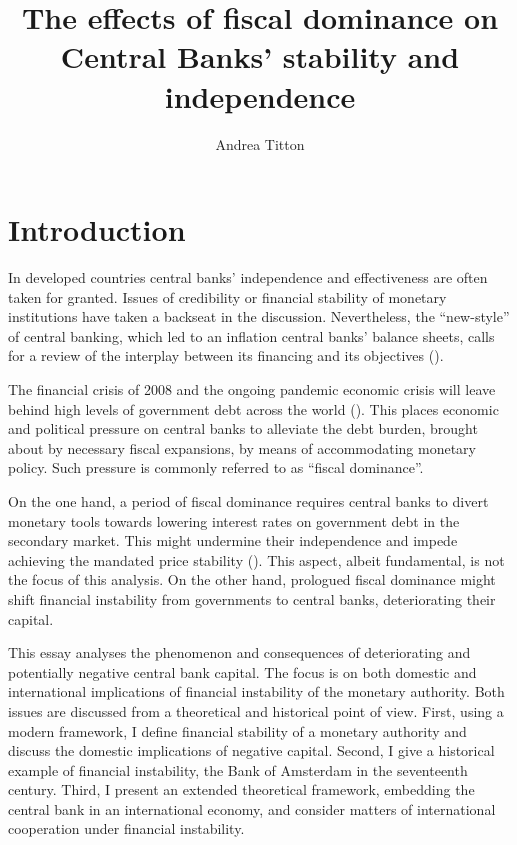 \documentclass[american]{scrartcl}
\title{The effects of fiscal dominance on Central Banks' stability and independence}
\author{Andrea Titton}
\newcommand{\comment}[1]{\iffalse#1\fi}
\begin{document}
\clearpage
\thispagestyle{empty}
\maketitle
\clearpage


\comment{
TODO: History | Theory of CB dividends | Financial stability under deferred assets |
Expectations of Inflation | Effects on global banks
}


\section{Introduction}

In developed countries central banks' independence and effectiveness are often taken for granted. Issues of credibility or financial stability of monetary institutions have taken a backseat in the discussion. Nevertheless, the ``new-style'' of central banking, which led to an inflation central banks' balance sheets, calls for a review of the interplay between its financing and its objectives (\cite{Hall2015}).

The financial crisis of 2008 and the ongoing pandemic economic crisis will leave behind high levels of government debt across the world (\cite{WEO2020}). This places economic and political pressure on central banks to alleviate the debt burden, brought about by necessary fiscal expansions, by means of accommodating monetary policy. Such pressure is commonly referred to as ``fiscal dominance''.

On the one hand, a period of fiscal dominance requires central banks to divert monetary tools towards lowering interest rates on government debt in the secondary market. This might undermine their independence and impede achieving the mandated price stability (\cite{FernandezAlbertos2015}). This aspect, albeit fundamental, is not the focus of this analysis. On the other hand, prologued fiscal dominance might shift financial instability from governments to central banks, deteriorating their capital.

This essay analyses the phenomenon and consequences of deteriorating and potentially negative central bank capital. The focus is on both domestic and international implications of financial instability of the monetary authority. Both issues are discussed from a theoretical and historical point of view. First, using a modern framework, I define financial stability of a monetary authority and discuss the domestic implications of negative capital. Second, I give a historical example of financial instability, the Bank of Amsterdam in the seventeenth century. Third, I present an extended theoretical framework, embedding the central bank in an international economy, and consider matters of international cooperation under financial instability. %
\end{document}
